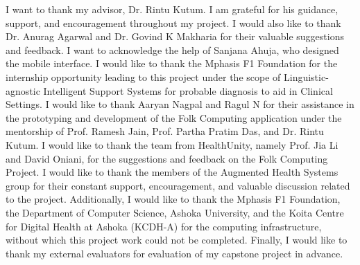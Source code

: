I want to thank my advisor, Dr. Rintu Kutum. I am grateful for his guidance, support, and encouragement throughout my project. I would also like to thank Dr. Anurag Agarwal and Dr. Govind K Makharia for their valuable suggestions and feedback. I want to acknowledge the help of Sanjana Ahuja, who designed the mobile interface. I would like to thank the Mphasis F1 Foundation for the internship opportunity leading to this project under the scope of Linguistic-agnostic Intelligent Support Systems for probable diagnosis to aid in Clinical Settings. I would like to thank Aaryan Nagpal and Ragul N for their assistance in the prototyping and development of the Folk Computing application under the mentorship of Prof. Ramesh Jain, Prof. Partha Pratim Das, and Dr. Rintu Kutum. I would like to thank the team from HealthUnity, namely Prof. Jia Li and David Oniani, for the suggestions and feedback on the Folk Computing Project. I would like to thank the members of the Augmented Health Systems group for their constant support, encouragement, and valuable discussion related to the project. Additionally, I would like to thank the Mphasis F1 Foundation, the Department of Computer Science, Ashoka University, and the Koita Centre for Digital Health at Ashoka (KCDH-A) for the computing infrastructure, without which this project work could not be completed. Finally, I would like to thank my external evaluators for evaluation of my capstone project in advance.